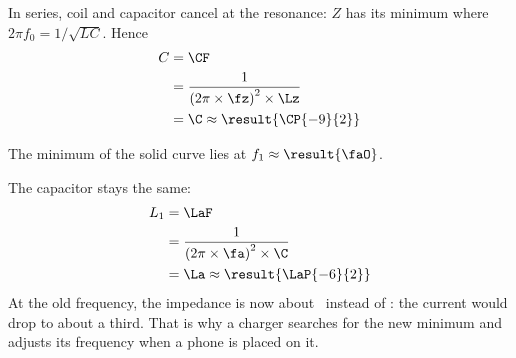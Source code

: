 \begin{abcliste}
\abc In series, coil and capacitor cancel at the resonance: $Z$ has its minimum where $2\pi f_0 = 1/\sqrt{L C}$. Hence
\begin{align}
 C &= \CF \\
   &= \frac{1}{\left(2\pi\times\fz\right)^2\times\Lz} \\
   &= \C \approx \result{\CP{-9}{2}}
\end{align}

\abc The minimum of the solid curve lies at $f_1 \approx \result{\faO}$.

\abc The capacitor stays the same:
\begin{align}
 L_1 &= \LaF \\
   &= \frac{1}{\left(2\pi\times\fa\right)^2\times\C} \\
   &= \La \approx \result{\LaP{-6}{2}}
\end{align}
At the old frequency, the impedance is now about \ZoO\ instead of \ZzO: the current would drop to about a third. That is why a charger searches for the new minimum and adjusts its frequency when a phone is placed on it.
\end{abcliste}
